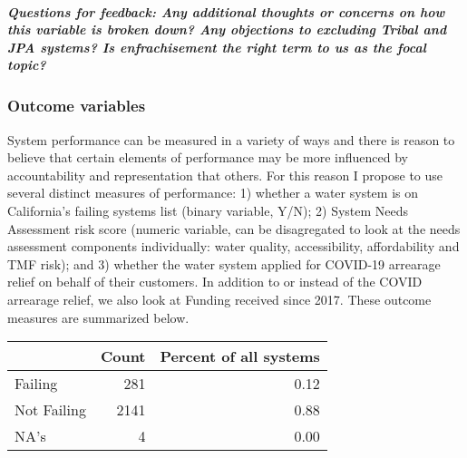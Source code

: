\documentclass[
]{article}
\begin{document}
\hypertarget{questions-for-feedback-any-additional-thoughts-or-concerns-on-how-this-variable-is-broken-down-any-objections-to-excluding-tribal-and-jpa-systems-is-enfrachisement-the-right-term-to-us-as-the-focal-topic}{%
\subparagraph{Questions for feedback: Any additional thoughts or
concerns on how this variable is broken down? Any objections to
excluding Tribal and JPA systems? Is enfrachisement the right term to us
as the focal
topic?}\label{questions-for-feedback-any-additional-thoughts-or-concerns-on-how-this-variable-is-broken-down-any-objections-to-excluding-tribal-and-jpa-systems-is-enfrachisement-the-right-term-to-us-as-the-focal-topic}}

\hypertarget{outcome-variables}{%
\subsubsection{Outcome variables}\label{outcome-variables}}

System performance can be measured in a variety of ways and there is
reason to believe that certain elements of performance may be more
influenced by accountability and representation that others. For this
reason I propose to use several distinct measures of performance: 1)
whether a water system is on California's failing systems list (binary
variable, Y/N); 2) System Needs Assessment risk score (numeric variable,
can be disagregated to look at the needs assessment components
individually: water quality, accessibility, affordability and TMF risk);
and 3) whether the water system applied for COVID-19 arrearage relief on
behalf of their customers. In addition to or instead of the COVID
arrearage relief, we also look at Funding received since 2017. These
outcome measures are summarized below.

\begin{longtable}[]{@{}lrr@{}}
\toprule\noalign{}
& Count & Percent of all systems \\
\midrule\noalign{}
\endhead
\bottomrule\noalign{}
\endlastfoot
Failing & 281 & 0.12 \\
Not Failing & 2141 & 0.88 \\
NA's & 4 & 0.00 \\
\end{longtable}
\end{document}
